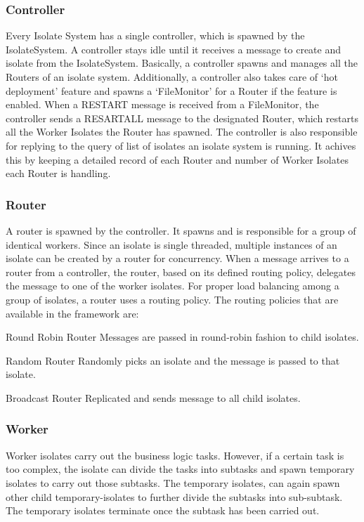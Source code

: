   \subsubsection{Controller}
  Every Isolate System has a single controller, which is spawned by the IsolateSystem. A controller stays idle until it receives a message to create and isolate from the IsolateSystem. Basically, a controller spawns and manages all the Routers of an isolate system. Additionally, a controller also takes care of ‘hot deployment’ feature and spawns a ‘FileMonitor’ for a Router if the feature is enabled. When a RESTART message is received from a FileMonitor, the controller sends a RESART\textunderscore{}ALL message to the designated Router, which restarts all the Worker Isolates the Router has spawned.
  The controller is also responsible for replying to the query of list of isolates an isolate system is running. It achives this by keeping a detailed record of each Router and number of Worker Isolates each Router is handling.

  \subsubsection{Router}
  A router is spawned by the controller. It spawns and is responsible for a group of identical workers. Since an isolate is single threaded, multiple instances of an isolate can be created by a router for concurrency. When a message arrives to a router from a controller, the router, based on its defined routing policy, delegates the message to one of the worker isolates.
  For proper load balancing among a group of isolates, a router uses a routing policy. The routing policies that are available in the framework are:

  \begin{description}
    \item{Round Robin Router} Messages are passed in round-robin fashion to child isolates.

    \item{Random Router} Randomly picks an isolate and the message is passed to that isolate.

    \item{Broadcast Router} Replicated and sends message to all child isolates.
  \end{description}

  \subsubsection{Worker}
  Worker isolates carry out the business logic tasks. However, if a certain task is too complex, the isolate can divide the tasks into subtasks and spawn temporary isolates to carry out those subtasks. The temporary isolates, can again spawn other child temporary-isolates to further divide the subtasks into sub-subtask. The temporary isolates terminate once the subtask has been carried out.

